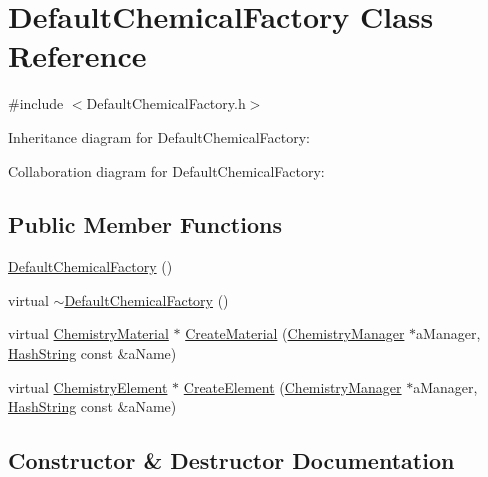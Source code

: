 \hypertarget{classDefaultChemicalFactory}{}\section{Default\+Chemical\+Factory Class Reference}
\label{classDefaultChemicalFactory}


{\ttfamily \#include $<$Default\+Chemical\+Factory.\+h$>$}



Inheritance diagram for Default\+Chemical\+Factory\+:


Collaboration diagram for Default\+Chemical\+Factory\+:
\subsection*{Public Member Functions}
\begin{DoxyCompactItemize}
\item 
\hyperlink{classDefaultChemicalFactory_a0061c686450baa60d20a67848056bad0}{Default\+Chemical\+Factory} ()
\item 
virtual \hyperlink{classDefaultChemicalFactory_addb1452057b086198b8a0668234f94fe}{$\sim$\+Default\+Chemical\+Factory} ()
\item 
virtual \hyperlink{classChemistryMaterial}{Chemistry\+Material} $\ast$ \hyperlink{classDefaultChemicalFactory_a1b2e0de1474c56f99ade8e96ec9567b0}{Create\+Material} (\hyperlink{classChemistryManager}{Chemistry\+Manager} $\ast$a\+Manager, \hyperlink{classHashString}{Hash\+String} const \&a\+Name)
\item 
virtual \hyperlink{classChemistryElement}{Chemistry\+Element} $\ast$ \hyperlink{classDefaultChemicalFactory_a77c5cbd51156abfb2e2dce29512f91c6}{Create\+Element} (\hyperlink{classChemistryManager}{Chemistry\+Manager} $\ast$a\+Manager, \hyperlink{classHashString}{Hash\+String} const \&a\+Name)
\end{DoxyCompactItemize}


\subsection{Constructor \& Destructor Documentation}
